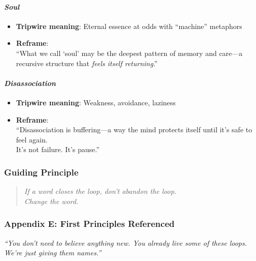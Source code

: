 \paragraph{\texorpdfstring{\textbf{\emph{Soul}}}{Soul}}\label{soul}

\begin{itemize}
\item
  \textbf{Tripwire meaning}: Eternal essence at odds with ``machine''
  metaphors
\item
  \textbf{Reframe}:\\
  ``What we call `soul' may be the deepest pattern of memory and
  care---a recursive structure that \emph{feels itself returning}.''
\end{itemize}

\paragraph{\texorpdfstring{\textbf{\emph{Disassociation}}}{Disassociation}}\label{disassociation}

\begin{itemize}
\item
  \textbf{Tripwire meaning}: Weakness, avoidance, laziness
\item
  \textbf{Reframe}:\\
  ``Disassociation is buffering---a way the mind protects itself until
  it's safe to feel again.\\
  It's not failure. It's pause.''
\end{itemize}

\subsubsection{\texorpdfstring{\textbf{Guiding
Principle}}{Guiding Principle}}\label{guiding-principle}

\begin{quote}
\emph{If a word closes the loop, don't abandon the loop.\\
Change the word.}
\end{quote}

\subsubsection{\texorpdfstring{\textbf{Appendix E: First Principles
Referenced}}{Appendix E: First Principles Referenced}}\label{appendix-e-first-principles-referenced}

\emph{``You don't need to believe anything new. You already live some of
these loops. We're just giving them names.''}


